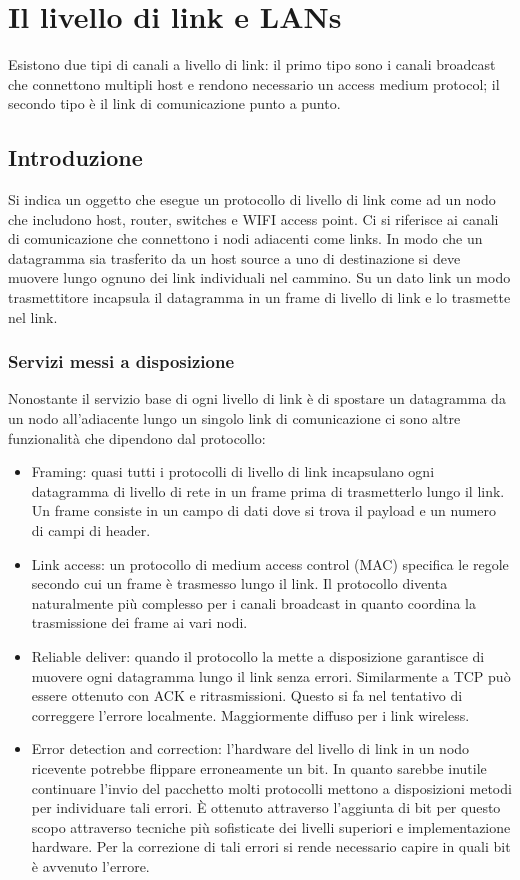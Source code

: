 \chapter{Il livello di link e LANs}
Esistono due tipi di canali a livello di link: il primo tipo sono i canali broadcast che connettono multipli host e rendono necessario un access medium protocol; il secondo tipo \`e il link di comunicazione punto a 
punto.
\section{Introduzione}
Si indica un oggetto che esegue un protocollo di livello di link come ad un nodo che includono host, router, switches e WIFI access point. Ci si riferisce ai canali di comunicazione che connettono i nodi adiacenti 
come links. In modo che un datagramma sia trasferito da un host source a uno di destinazione si deve muovere lungo ognuno dei link individuali nel cammino. Su un dato link un modo trasmettitore incapsula
il datagramma in un frame di livello di link e lo trasmette nel link. 
\subsection{Servizi messi a disposizione}
Nonostante il servizio base di ogni livello di link \`e di spostare un datagramma da un nodo all'adiacente lungo un singolo link di comunicazione ci sono altre funzionalit\`a che dipendono dal protocollo:
\begin{itemize}
\item Framing: quasi tutti i protocolli di livello di link incapsulano ogni datagramma di livello di rete in un frame prima di trasmetterlo lungo il link. Un frame consiste in un campo di dati dove si trova il payload e 
un numero di campi di header. 
\item Link access: un protocollo di medium access control (MAC) specifica le regole secondo cui un frame \`e trasmesso lungo il link. Il protocollo diventa naturalmente pi\`u complesso per i canali broadcast in 
quanto coordina la trasmissione dei frame ai vari nodi.
\item Reliable deliver: quando il protocollo la mette a disposizione garantisce di muovere ogni datagramma lungo il link senza errori.  Similarmente  a TCP pu\`o essere ottenuto con ACK e ritrasmissioni. Questo
si fa nel tentativo di correggere l'errore localmente. Maggiormente diffuso per i link wireless.
\item Error detection and correction: l'hardware del livello di link in un nodo ricevente potrebbe flippare erroneamente un bit. In quanto sarebbe inutile continuare l'invio del pacchetto molti protocolli mettono
a disposizioni metodi per individuare tali errori. \`E ottenuto attraverso l'aggiunta di bit per questo scopo attraverso tecniche pi\`u sofisticate dei livelli superiori e implementazione hardware. Per la correzione di
tali errori si rende necessario capire in quali bit \`e avvenuto l'errore.  
\end{itemize}

